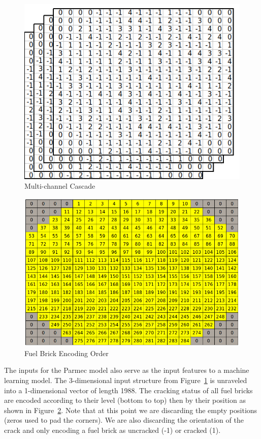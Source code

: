 \begin{figure}[t]
	\centering
	\includegraphics[scale=0.45]{Figures/InputCascade.png}
	\caption{Multi-channel Cascade}
	\label{fig:cascade}
\end{figure}

\begin{figure}[t]
	\centering
	\includegraphics[scale=0.35]{Figures/fuel_channel_numbers.png}
	\caption{Fuel Brick Encoding Order}
	\label{fig:order}
\end{figure}


\noindent
The inputs for the Parmec model also serve as the input features to a machine learning model. The 3-dimensional input structure from Figure~\ref{fig:cascade} is unraveled into a 1-dimensional vector of length 1988. The cracking status of all fuel bricks are encoded according to their level (bottom to top) then by their position as shown in Figure~\ref{fig:order}. Note that at this point we are discarding the empty positions (zeros used to pad the corners). We are also discarding the orientation of the crack and only encoding a fuel brick as uncracked (-1) or cracked (1).
\\

